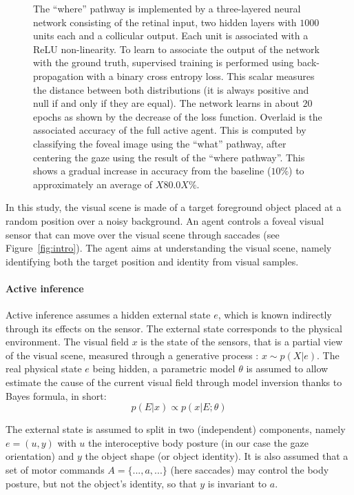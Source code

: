 \begin{figure}[t!]
{\else
\C The ``where'' pathway is implemented by a three-layered neural network consisting of the retinal input, two hidden layers with $1000$ units each and a collicular output. Each unit is associated with a ReLU non-linearity. To learn to associate the output of the network with the ground truth, supervised training is performed using back-propagation with a binary cross entropy loss. This scalar measures the distance between both distributions (it is always positive and null if and only if they are equal). The network learns in about $20$ epochs as shown by the decrease of the loss function. Overlaid is the associated accuracy of the full active agent. This is computed by classifying the foveal image using the ``what'' pathway, after centering the gaze using the result of the ``where pathway''. This shows a gradual increase in accuracy from the baseline ($10\%$) to approximately an average of $X80.0X\%$. %
\fi
		\label{fig:methods}}%
\end{figure}%
In this study, the visual scene is made of a target foreground object placed at a random position over a noisy background. An agent controls a foveal visual sensor that can move over the visual scene through saccades (see Figure~\ref{fig:intro}). 
The agent aims at understanding the visual scene, namely identifying both the target position and identity from visual samples.

\paragraph{Active inference}
Active inference assumes a hidden external state $e$, which is known indirectly through its effects on the sensor. The external state  corresponds to the physical environment. The visual field $x$ is the state of the sensors, that is a partial view of the visual scene, measured through a generative process : $x\sim p(X|e)$. The real physical state $e$ being hidden, a parametric model $\theta$ is assumed to allow estimate the cause of the current visual field through model inversion thanks to Bayes formula, in short:
$$p(E|x) \propto p(x|E;\theta)$$


The external state is assumed to split in two (independent) components, namely $e = (u,y)$ with $u$ the interoceptive body posture (in our case the gaze orientation) and $y$ the object shape (or object identity).
It is also assumed that a set of motor commands $A = \{..., a, ...\}$ (here saccades) may control the body posture, but not the object's identity, so that $y$ is invariant to $a$.

